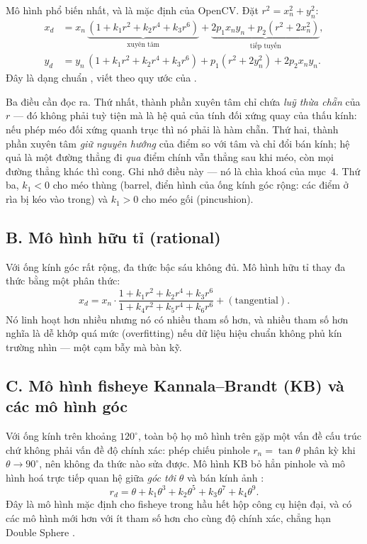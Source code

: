 \documentclass[../../marker.tex]{subfiles}
\begin{document}
Mô hình phổ biến nhất, và là mặc định của OpenCV. Đặt \(r^2 = x_n^2 + y_n^2\):
\begin{align}
x_d &= x_n\,\underbrace{(1 + k_1 r^2 + k_2 r^4 + k_3 r^6)}_{\text{xuyên tâm}}
     + \underbrace{2p_1 x_n y_n + p_2(r^2 + 2x_n^2)}_{\text{tiếp tuyến}}, \label{eq:a01-brown}\\
y_d &= y_n\,(1 + k_1 r^2 + k_2 r^4 + k_3 r^6)
     + p_1(r^2 + 2y_n^2) + 2p_2 x_n y_n . \nonumber
\end{align}
Đây là dạng chuẩn \cite{brown1971close}, viết theo quy ước của \cite{zhang2000flexible}.

Ba điều cần đọc ra. Thứ nhất, thành phần xuyên tâm chỉ chứa \emph{luỹ thừa chẵn} của \(r\) --- đó không phải tuỳ tiện mà là hệ quả của tính đối xứng quay của thấu kính: nếu phép méo đối xứng quanh trục thì nó phải là hàm chẵn. Thứ hai, thành phần xuyên tâm \emph{giữ nguyên hướng} của điểm so với tâm và chỉ đổi bán kính; hệ quả là một đường thẳng đi \emph{qua} điểm chính vẫn thẳng sau khi méo, còn mọi đường thẳng khác thì cong. Ghi nhớ điều này --- nó là chìa khoá của mục~4. Thứ ba, \(k_1 < 0\) cho méo thùng (barrel, điển hình của ống kính góc rộng: các điểm ở rìa bị kéo vào trong) và \(k_1 > 0\) cho méo gối (pincushion).

\subsection{B. Mô hình hữu tỉ (rational)}

Với ống kính góc rất rộng, đa thức bậc sáu không đủ. Mô hình hữu tỉ thay đa thức bằng một phân thức:
\[
x_d = x_n \cdot \frac{1 + k_1 r^2 + k_2 r^4 + k_3 r^6}{1 + k_4 r^2 + k_5 r^4 + k_6 r^6} + (\text{tangential}).
\]
Nó linh hoạt hơn nhiều nhưng nó có nhiều tham số hơn, và nhiều tham số hơn nghĩa là dễ khớp quá mức (overfitting) nếu dữ liệu hiệu chuẩn không phủ kín trường nhìn --- một cạm bẫy mà  bàn kỹ.

\subsection{C. Mô hình fisheye Kannala--Brandt (KB) và các mô hình góc}

Với ống kính trên khoảng \(120^\circ\), toàn bộ họ mô hình trên gặp một vấn đề cấu trúc chứ không phải vấn đề độ chính xác: phép chiếu pinhole \(r_n = \tan\theta\) phân kỳ khi \(\theta \to 90^\circ\), nên không đa thức nào sửa được. Mô hình KB bỏ hẳn pinhole và mô hình hoá trực tiếp quan hệ giữa \emph{góc tới} \(\theta\) và bán kính ảnh \cite{kannala2006generic}:
\[
r_d = \theta + k_1\theta^3 + k_2\theta^5 + k_3\theta^7 + k_4\theta^9 .
\]
Đây là mô hình mặc định cho fisheye trong hầu hết hộp công cụ hiện đại, và có các mô hình mới hơn với ít tham số hơn cho cùng độ chính xác, chẳng hạn Double Sphere \cite{usenko2018double}.
\end{document}
